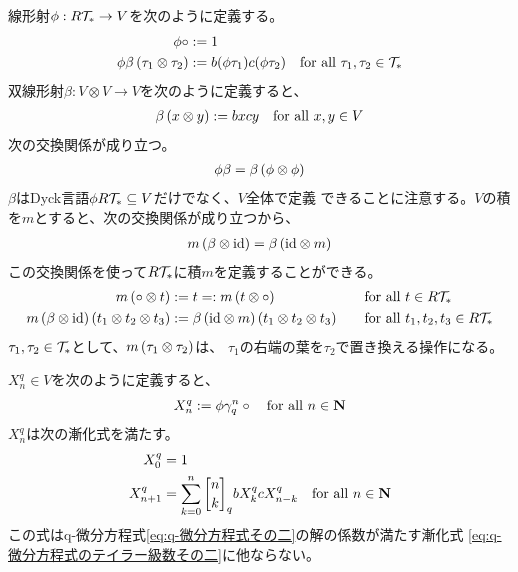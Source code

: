 {	線形射$\phi:R{{\mathcal{T}}}_*\to V$を次のように定義する。
	\begin{equation*}\begin{split}
		\phi\circ &:= 1 \\
		\phi\beta\left({\tau_1\otimes\tau_2}\right) &:= b(\phi\tau_1)c(\phi\tau_2)
		\quad\text{for all } \tau_1,\tau_2\in{\ensuremath{{\mathcal{T}}}}_*
	\end{split}\end{equation*}
	双線形射$\beta:V\otimes V\to V$を次のように定義すると、
	\begin{equation*}\begin{split}
		\beta\left({x\otimes y}\right) := bxcy \quad\text{for all } x,y\in V
	\end{split}\end{equation*}
	次の交換関係が成り立つ。
	\begin{equation*}\begin{split}
		\phi\beta = \beta\left({\phi\otimes\phi}\right)
	\end{split}\end{equation*}
	$\beta$はDyck言語$\phi R{{\mathcal{T}}}_*\subseteq V$だけでなく、$V$全体で定義
	できることに注意する。$V$の積を$m$とすると、次の交換関係が成り立つから、
	\begin{equation*}\begin{split}
		m\left({\beta\otimes{\ensuremath{\operatorname{id}}}}\right) = \beta\left({{\operatorname{id}}\otimes m}\right)
	\end{split}\end{equation*}
	この交換関係を使って$R{{\mathcal{T}}}_*$に積$m$を定義することができる。
	\begin{alignat*}{2}
		m\left({\circ\otimes t}\right) &:= t =: m\left({t\otimes\circ}\right)
			&\quad&\text{for all } t\in R{{\mathcal{T}}}_* \\
		m\left({\beta\otimes{\ensuremath{\operatorname{id}}}}\right)\left({t_1\otimes t_2\otimes t_3}\right) 
			&:= \beta\left({{\operatorname{id}}\otimes m}\right)\left({t_1\otimes t_2\otimes t_3}\right)
			&\quad&\text{for all } t_1,t_2,t_3\in R{{\mathcal{T}}}_*
	\end{alignat*}
	$\tau_1,\tau_2\in{\ensuremath{{\mathcal{T}}}}_*$として、$m\left({\tau_1\otimes\tau_2}\right)$は、
	$\tau_1$の右端の葉を$\tau_2$で置き換える操作になる。
	
	$X^q_n\in V$を次のように定義すると、
	\begin{equation*}\begin{split}
		X^q_n := \phi\gamma_q^n\circ \quad\text{for all } n\in\mathbf{N}
	\end{split}\end{equation*}
	$X^q_n$は次の漸化式を満たす。
	\begin{equation*}\begin{split}
		X^q_0 &= 1 \\
		X^q_{n+1} &= \sum_{k=0}^n \qbinom{n}{k}_q bX^q_kcX^q_{n-k}
		\quad\text{for all } n\in\sizen
	\end{split}\end{equation*}
	この式はq-微分方程式\eqref{eq:q-微分方程式その二}の解の係数が満たす漸化式
	\eqref{eq:q-微分方程式のテイラー級数その二}に他ならない。

}
